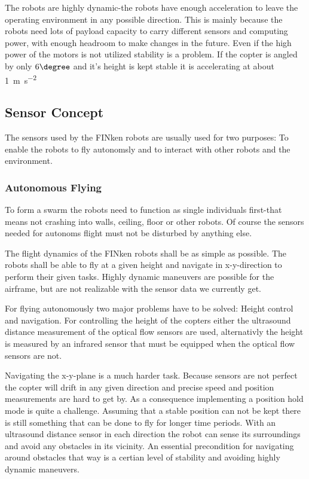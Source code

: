 The robots are highly dynamic-the robots have enough acceleration to leave the operating environment in any possible direction.
This is mainly because the robots need lots of payload capacity to carry different sensors and computing power, with enough headroom to make changes in the future.
Even if the high power of the motors is not utilized stability is a problem.
If the copter is angled by only $6\degree$ and it's height is kept stable it is accelerating at about \SI{1}{\metre\per\square\second} 

\subsection{Sensor Concept}
The sensors used by the FINken robots are usually used for two purposes: To enable the robots to fly autonomsly and to interact with other robots and the environment.

\subsubsection{Autonomous Flying}
To form a swarm the robots need to function as single individuals first-that means not crashing into walls, ceiling, floor or other robots.
Of course the sensors needed for autonoms flight must not be disturbed by anything else. 

The flight dynamics of the FINken robots shall be as simple as possible.
The robots shall be able to fly at a given height and navigate in x-y-direction to perform their given tasks.
Highly dynamic maneuvers are possible for the airframe, but are not realizable with the sensor data we currently get. 

For flying autonomously two major problems have to be solved: Height control and navigation.
For controlling the height of the copters either the ultrasound distance measurement of the optical flow sensors are used, alternativly the height is measured by an infrared sensor that must be equipped when the optical flow sensors are not.

Navigating the x-y-plane is a much harder task.
Because sensors are not perfect the copter will drift in any given direction and precise speed and position measurements are hard to get by.
As a consequence implementing a position hold mode is quite a challenge. 
Assuming that a stable position can not be kept there is still something that can be done to fly for longer time periods.
With an ultrasound distance sensor in each direction the robot can sense its surroundings and avoid any obstacles in its vicinity.
An essential precondition for navigating around obstacles that way is a certian level of stability and avoiding highly dynamic maneuvers.

